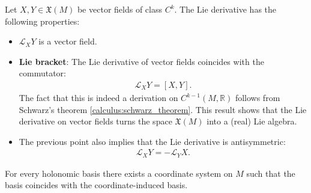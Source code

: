     \begin{property}
        Let $X,Y\in\mathfrak{X}(M)$ be vector fields of class $C^k$. The Lie derivative has the following properties:
        \begin{itemize}
            \item $\mathcal{L}_XY$ is a vector field.
            \item\textbf{Lie bracket}: The Lie derivative of vector fields coincides with the commutator:
                \begin{gather}
                    \label{bundle:lie_bracket}
                    \mathcal{L}_XY = [X,Y].
                \end{gather}
                The fact that this is indeed a derivation on $C^{k-1}(M,\mathbb{R})$ follows from Schwarz's theorem \ref{calculus:schwarz_theorem}. This result shows that the Lie derivative on vector fields turns the space $\mathfrak{X}(M)$ into a (real) Lie algebra.
            \item The previous point also implies that the Lie derivative is antisymmetric:
                \begin{gather}
                    \label{bundle:lie_derivative_antisymmetry}
                    \mathcal{L}_XY = -\mathcal{L}_YX.
                \end{gather}
        \end{itemize}
    \end{property}

    \begin{property}
        For every holonomic basis there exists a coordinate system on $M$ such that the basis coincides with the coordinate-induced basis.
    \end{property}

